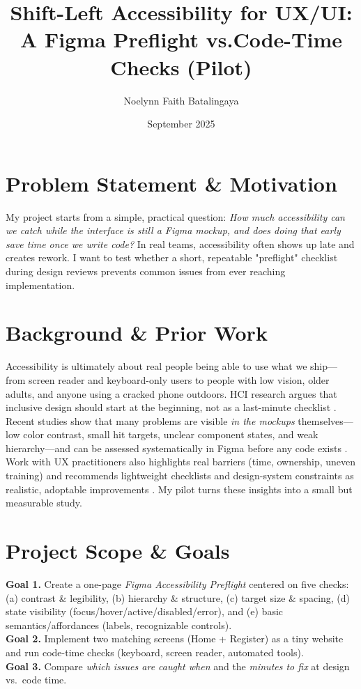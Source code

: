 \documentclass[12pt]{article}
\title{\textbf{Shift-Left Accessibility for UX/UI: A Figma Preflight vs.Code-Time Checks (Pilot)}}
\author{Noelynn Faith Batalingaya}
\date{September 2025}
\begin{document}
\maketitle

\section*{Problem Statement \& Motivation}
My project starts from a simple, practical question: \emph{How much accessibility can we catch while the interface is still a Figma mockup, and does doing that early save time once we write code?} In real teams, accessibility often shows up late and creates rework. I want to test whether a short, repeatable "preflight" checklist during design reviews prevents common issues from ever reaching implementation.

\section*{Background \& Prior Work}
Accessibility is ultimately about real people being able to use what we ship—from screen reader and keyboard-only users to people with low vision, older adults, and anyone using a cracked phone outdoors. HCI research argues that inclusive design should start at the beginning, not as a last-minute checklist \cite{bennett2018inclusive}. Recent studies show that many problems are visible \emph{in the mockups} themselves—low color contrast, small hit targets, unclear component states, and weak hierarchy—and can be assessed systematically in Figma before any code exists \cite{huang2024a11yfigma, chen2024figmaapps}. Work with UX practitioners also highlights real barriers (time, ownership, uneven training) and recommends lightweight checklists and design-system constraints as realistic, adoptable improvements \cite{shi2023uxaccesspractice}. My pilot turns these insights into a small but measurable study.

\section*{Project Scope \& Goals}
\textbf{Goal 1.} Create a one-page \emph{Figma Accessibility Preflight} centered on five checks: (a) contrast \& legibility, (b) hierarchy \& structure, (c) target size \& spacing, (d) state visibility (focus/hover/active/disabled/error), and (e) basic semantics/affordances (labels, recognizable controls).\\
\textbf{Goal 2.} Implement two matching screens (Home + Register) as a tiny website and run code-time checks (keyboard, screen reader, automated tools).\\
\textbf{Goal 3.} Compare \emph{which issues are caught when} and the \emph{minutes to fix} at design vs.\ code time.
\end{document}
